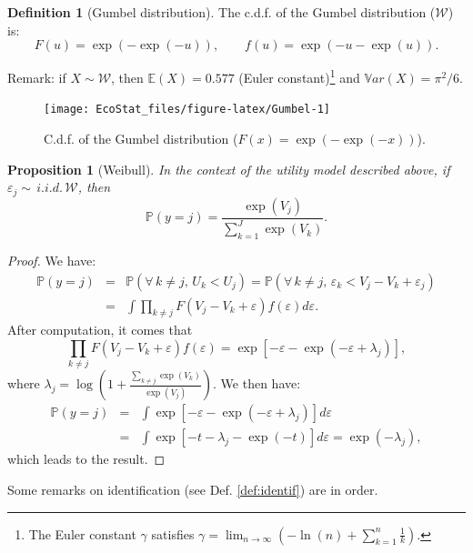 \documentclass[
  12pt,
]{book}
\newtheorem{proposition}{Proposition}[chapter]
\theoremstyle{definition}
\newtheorem{definition}{Definition}[chapter]
\theoremstyle{definition}
\theoremstyle{definition}
\theoremstyle{definition}
\theoremstyle{remark}
\begin{document}
\begin{definition}[Gumbel distribution]
\protect\hypertarget{def:Gumbel}{}\label{def:Gumbel}The c.d.f. of the Gumbel distribution (\(\mathcal{W}\)) is:
\[
F(u) = \exp(-\exp(-u)), \qquad f(u)=\exp(-u-\exp(u)).
\]
\end{definition}

Remark: if \(X\sim\mathcal{W}\), then \(\mathbb{E}(X)=0.577\) (Euler constant)\footnote{The Euler constant \(\gamma\) satisfies \(\gamma = \lim_{n\rightarrow \infty} \left(- \ln(n) + \sum_{k=1}^n \frac{1}{k}\right)\).} and \(\mathbb{V}ar(X)=\pi^2/6\).

\begin{figure}
\texttt{[image: EcoStat\_files/figure-latex/Gumbel-1]} \caption{C.d.f. of the Gumbel distribution ($F(x)=\exp(-\exp(-x))$).}\label{fig:Gumbel}
\end{figure}

\begin{proposition}[Weibull]
\protect\hypertarget{prp:Weibull}{}\label{prp:Weibull}In the context of the utility model described above, if \(\varepsilon_j \sim \,i.i.d.\,\mathcal{W}\), then
\[
\mathbb{P}(y=j) = \frac{\exp(V_j)}{\sum_{k=1}^J \exp(V_k)}.
\]
\end{proposition}

\begin{proof}
We have:
\begin{eqnarray*}
\mathbb{P}(y=j) &=& \mathbb{P}(\forall\,k \ne j,\,U_k < U_j) =  \mathbb{P}(\forall\,k \ne j,\,\varepsilon_k < V_j - V_k + \varepsilon_j) \\
&=& \int \prod_{k \ne j} F(V_j - V_k + \varepsilon) f(\varepsilon)d\varepsilon.
\end{eqnarray*}
After computation, it comes that
\[
\prod_{k \ne j} F(V_j - V_k + \varepsilon) f(\varepsilon) = \exp\left[-\varepsilon-\exp(-\varepsilon+\lambda_j)\right],
\]
where \(\lambda_j = \log\left(1 + \frac{\sum_{k \ne j} \exp(V_k)}{\exp(V_j)}\right)\). We then have:
\begin{eqnarray*}
\mathbb{P}(y=j) &=& \int  \exp\left[-\varepsilon-\exp(-\varepsilon+\lambda_j)\right] d\varepsilon\\
&=& \int  \exp\left[-t - \lambda_j-\exp(-t)\right] d\varepsilon = \exp(- \lambda_j),
\end{eqnarray*}
which leads to the result.
\end{proof}

Some remarks on identification (see Def. \ref{def:identif}) are in order.
\end{document}
